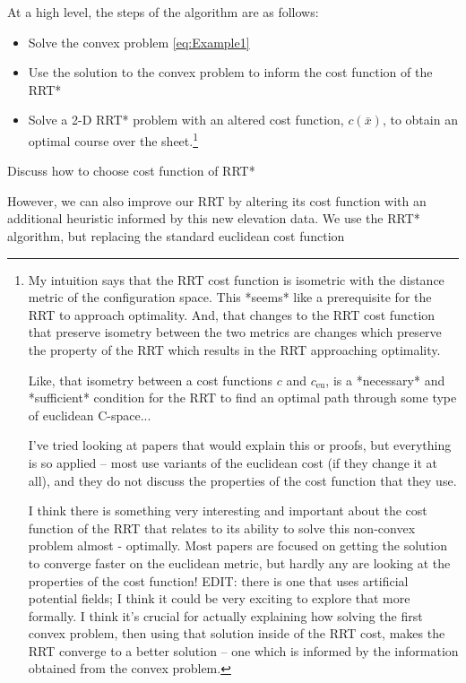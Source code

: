 \documentclass[letterpaper, 12pt]{article}
\newcommand{\dac}[1]{\color{red}#1}
\begin{document}
At a high level, the steps of the algorithm are as follows:

\begin{itemize}
    \item Solve the convex problem \eqref{eq:Example1}
    \item Use the solution to the convex problem to inform the cost function of the RRT*
    \item Solve a 2-D RRT* problem with an altered cost function, $c(\bar{x})$, to obtain an optimal course over the sheet.\footnote{
My intuition says that the RRT cost function is isometric with the distance metric of the configuration space. This *seems* like a prerequisite for the RRT to approach optimality. And, that changes to the RRT cost function that preserve isometry between the two metrics are changes which preserve the property of the RRT which results in the RRT approaching optimality.

Like, that isometry between a cost functions $c$ and $c_\text{eu}$, is a *necessary* and *sufficient* condition for the RRT to find an optimal path through some type of euclidean C-space...

I've tried looking at papers that would explain this or proofs, but everything is so applied -- most use variants of the euclidean cost (if they change it at all), and they do not discuss the properties of the cost function that they use.

I think there is something very interesting and important about the cost function of the RRT that relates to its ability to solve this non-convex problem almost - optimally. Most papers are focused on getting the solution to converge faster on the euclidean metric, but hardly any are looking at the properties of the cost function! EDIT: there is one that uses artificial potential fields; \cite{} I think it could be very exciting to explore that more formally. I think it's crucial for actually explaining how solving the first convex problem, then using that solution inside of the RRT cost, makes the RRT converge to a better solution -- one which is informed by the information obtained from the convex problem.}
\end{itemize}


{\dac Discuss how to choose cost function of RRT*}

However, we can also improve our RRT by altering its cost function with an additional heuristic informed by this new elevation data. We use the RRT* algorithm, but replacing the standard euclidean cost function
\end{document}
